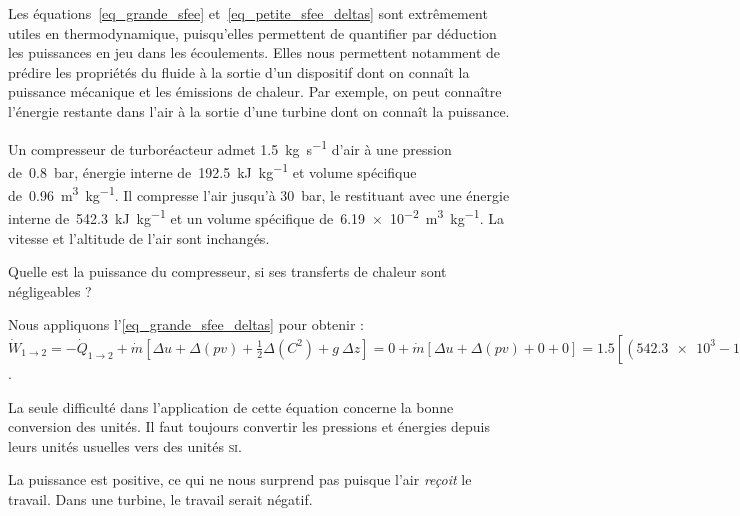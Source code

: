 		Les équations~\ref{eq_grande_sfee} et~\ref{eq_petite_sfee_deltas} sont extrêmement utiles en thermodynamique, puisqu’elles permettent de quantifier par déduction les puissances en jeu dans les écoulements. Elles nous permettent notamment de prédire les propriétés du fluide à la sortie d’un dispositif dont on connaît la puissance mécanique et les émissions de chaleur. Par exemple, on peut connaître l’énergie restante dans l’air à la sortie d’une turbine dont on connaît la puissance.

		
		\begin{anexample}
			Un compresseur de turboréacteur admet \SI{1,5}{\kilogram\per\second} d’air à une pression de~\SI{0,8}{\bar}, énergie interne de~\SI{192,5}{\kilo\joule\per\kilogram} et volume spécifique de~\SI{0,96}{\metre\cubed\per\kilogram}. Il compresse l’air jusqu’à \SI{30}{\bar}, le restituant avec une énergie interne de~\SI{542,3}{\kilo\joule\per\kilogram} et un volume spécifique de~\SI{6,19e-2}{\metre\cubed\per\kilogram}. La vitesse et l’altitude de l’air sont inchangés.
			
			Quelle est la puissance du compresseur, si ses transferts de chaleur sont négligeables ?
				\begin{answer}
					Nous appliquons l’\cref{eq_grande_sfee_deltas} pour obtenir :  $\dot{W}_{1 \to 2}
					= -\dot{Q}_{1 \to 2} + \dot{m} \left[ \Delta u + \Delta (p v) + \frac{1}{2} \Delta \left(C^2\right) + g \ \Delta z \right]
					= 0 + \dot{m} \left[ \Delta u + \Delta (p v) + 0 + 0 \right]
					= \num{1,5} \left[ (\num{542,3e3} - \num{192,5e3}) + (\num{30e5}\times\num{6,19e-2} - \num{0,8e5}\times\num{0,96})\right]
					= \SI{+6,881e5}{\watt} = \SI{+688,1}{\kilo\watt}$.
					\begin{remark}La seule difficulté dans l’application de cette équation concerne la bonne conversion des unités. Il faut toujours convertir les pressions et énergies depuis leurs unités usuelles vers des unités \textsc{si}.\end{remark}
					\begin{remark}La puissance est positive, ce qui ne nous surprend pas puisque l’air \emph{reçoit} le travail. Dans une turbine, le travail serait négatif.\end{remark}
				\end{answer}
		\end{anexample}

